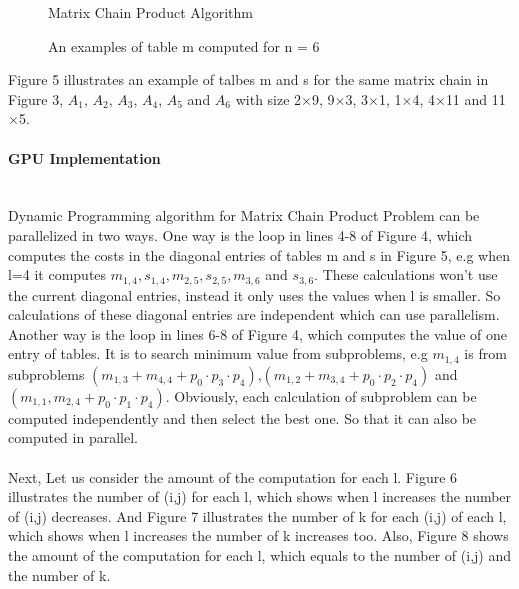 \documentclass[11pt]{article}
\begin{document}
\begin{figure}[H]
\begin{minipage}{0.5\textwidth}
  \centering
	\fbox{\texttt{[image: dp3]} }
	\caption{Matrix Chain Product Algorithm ~\cite{DP}}
	\label{fig:dp3}
\end{minipage}%
\centering
\begin{minipage}{.5\textwidth}
  \centering
	\fbox{\texttt{[image: dp4]} } 
	\label{fig:dp4}
	\caption{An examples of table m computed for n = 6 ~\cite{DP}}
\end{minipage}%
\end{figure}

Figure 5 illustrates an example of talbes m and s for the same matrix chain in Figure 3, $A_1$, $A_2$, $A_3$, $A_4$, $A_5$ and $A_6$ with size 2$\times $9, 9$\times $3, 3$\times $1, 1$\times $4, 4$\times $11 and 11$\times $5.\\
			
		\paragraph{GPU Implementation}		
\hfill \\

Dynamic Programming algorithm for Matrix Chain Product Problem can be parallelized in two ways. One way is the loop in lines 4-8 of Figure 4, which computes the costs in the diagonal entries of tables m and s in Figure 5, e.g when l=4 it computes $m_{1,4},s_{1,4},m_{2,5},s_{2,5},m_{3,6}$ and $s_{3,6}$. These calculations won't use the current diagonal entries, instead it only uses the values when l is smaller. So calculations of these diagonal entries are independent which can use parallelism. Another way is the loop in lines 6-8 of Figure 4, which computes the value of one entry of tables. It is to search minimum value from subproblems, e.g $m_{1,4}$ is from subproblems $(m_{1,3}+m_{4,4}+p_0 \cdot p_3 \cdot p_4)$,$(m_{1,2}+m_{3,4}+p_0 \cdot p_2 \cdot p_4)$ and $(m_{1,1},m_{2,4}+p_0 \cdot p_1 \cdot p_4)$. Obviously, each calculation of subproblem can be computed independently and then select the best one. So that it can also be computed in parallel. \\
\\
Next, Let us consider the amount of the computation for each l. Figure 6 illustrates the number of (i,j) for each l, which shows when l increases the number of (i,j) decreases. And Figure 7 illustrates the number of k for each (i,j) of each l, which shows when l increases the number of k increases too. Also, Figure 8 shows the amount of the computation for each l, which equals to the number of (i,j) and the number of k.  
\end{document}
